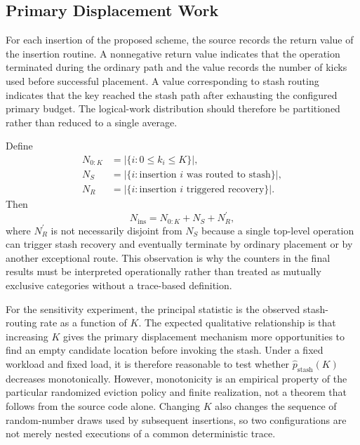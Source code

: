\documentclass[conference]{IEEEtran}
\begin{document}
\subsection{Primary Displacement Work}
\label{subsec:primary_displacement_results}

For each insertion of the proposed scheme, the source records the return value of the insertion routine. A nonnegative return value indicates that the operation terminated during the ordinary path and the value records the number of kicks used before successful placement. A value corresponding to stash routing indicates that the key reached the stash path after exhausting the configured primary budget. The logical-work distribution should therefore be partitioned rather than reduced to a single average.

Define
\begin{align}
N_{0:K} &= |\{i: 0\leq k_i\leq K\}|,\\
N_{S} &= |\{i: \text{insertion }i\text{ was routed to stash}\}|,\\
N_{R} &= |\{i: \text{insertion }i\text{ triggered recovery}\}|.
\end{align}
Then
\begin{equation}
N_{\mathrm{ins}} = N_{0:K} + N_{S} + N_{R}^{\prime},
\end{equation}
where $N_R^{\prime}$ is not necessarily disjoint from $N_S$ because a single top-level operation can trigger stash recovery and eventually terminate by ordinary placement or by another exceptional route. This observation is why the counters in the final results must be interpreted operationally rather than treated as mutually exclusive categories without a trace-based definition.

For the sensitivity experiment, the principal statistic is the observed stash-routing rate as a function of $K$. The expected qualitative relationship is that increasing $K$ gives the primary displacement mechanism more opportunities to find an empty candidate location before invoking the stash. Under a fixed workload and fixed load, it is therefore reasonable to test whether $\widehat{p}_{\mathrm{stash}}(K)$ decreases monotonically. However, monotonicity is an empirical property of the particular randomized eviction policy and finite realization, not a theorem that follows from the source code alone. Changing $K$ also changes the sequence of random-number draws used by subsequent insertions, so two configurations are not merely nested executions of a common deterministic trace.
\end{document}
